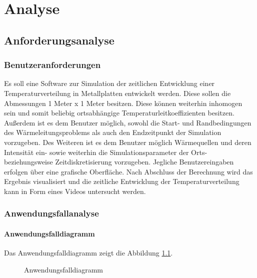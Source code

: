 \chapter{Analyse}
\section{Anforderungsanalyse}

\subsection{Benutzeranforderungen}

Es soll eine Software zur Simulation der zeitlichen Entwicklung einer Temperaturverteilung in Metallplatten entwickelt werden. Diese sollen die Abmessungen 1 Meter x 1 Meter besitzen. Diese können weiterhin inhomogen sein und somit beliebig ortsabhängige Temperaturleitkoeffizienten besitzen. Außerdem ist es dem Benutzer möglich, sowohl die Start- und Randbedingungen des Wärmeleitungsproblems als auch den Endzeitpunkt der Simulation vorzugeben. Des Weiteren ist es dem Benutzer möglich Wärmequellen und deren Intensität ein- sowie weiterhin die Simulationsparameter der Orts- beziehungsweise Zeitdiskretisierung vorzugeben. Jegliche Benutzereingaben erfolgen über eine grafische Oberfläche. Nach Abschluss der Berechnung wird das Ergebnis visualisiert und die zeitliche Entwicklung der Temperaturverteilung kann in Form eines Videos untersucht werden.


\subsection{Anwendungsfallanalyse} \label{Kapitel Use Case Analyse}

\subsubsection{Anwendungsfalldiagramm}
Das Anwendungsfalldiagramm zeigt die Abbildung \ref{Use Case Diagramm}.
\begin{figure}[H]
	\centering
	\caption{Anwendungsfalldiagramm}
	\label{Use Case Diagramm}
\end{figure}

